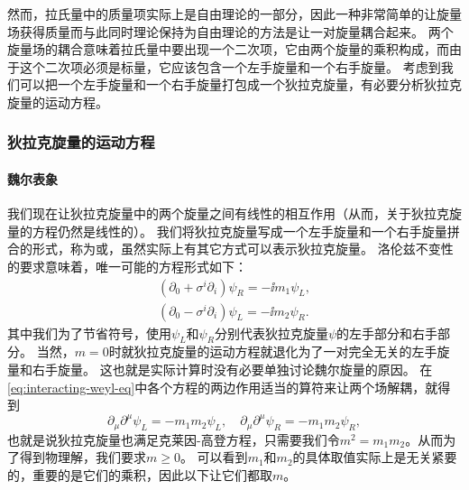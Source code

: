 然而，拉氏量中的质量项实际上是自由理论的一部分，因此一种非常简单的让旋量场获得质量而与此同时理论保持为自由理论的方法是让一对旋量耦合起来。
两个旋量场的耦合意味着拉氏量中要出现一个二次项，它由两个旋量的乘积构成，而由于这个二次项必须是标量，它应该包含一个左手旋量和一个右手旋量。
考虑到我们可以把一个左手旋量和一个右手旋量打包成一个狄拉克旋量，有必要分析狄拉克旋量的运动方程。

\subsubsection{狄拉克旋量的运动方程} 

\paragraph{魏尔表象} 我们现在让狄拉克旋量中的两个旋量之间有线性的相互作用（从而，关于狄拉克旋量的方程仍然是线性的）。
我们将狄拉克旋量写成一个左手旋量和一个右手旋量拼合的形式，称为或，虽然实际上有其它方式可以表示狄拉克旋量。
洛伦兹不变性的要求意味着，唯一可能的方程形式如下：
\begin{equation}
    \begin{aligned}
        (\partial_0 + \sigma^i \partial_i) \psi_R = - \ii m_1 \psi_L, \\
        (\partial_0 - \sigma^i \partial_i) \psi_L = - \ii m_2 \psi_R.
    \end{aligned}
    \label{eq:interacting-weyl-eq}
\end{equation}
其中我们为了节省符号，使用$\psi_L$和$\psi_R$分别代表狄拉克旋量$\psi$的左手部分和右手部分。
当然，$m=0$时就狄拉克旋量的运动方程就退化为了一对完全无关的左手旋量和右手旋量。
这也就是实际计算时没有必要单独讨论魏尔旋量的原因。
在\eqref{eq:interacting-weyl-eq}中各个方程的两边作用适当的算符来让两个场解耦，就得到
\[
    \partial_\mu \partial^\mu \psi_L = - m_1 m_2 \psi_L, \quad \partial_\mu \partial^\mu \psi_R = - m_1 m_2 \psi_R,
\]
也就是说狄拉克旋量也满足克莱因-高登方程，只需要我们令$m^2=m_1 m_2$。从而为了得到物理解，我们要求$m \geq 0$。
可以看到$m_1$和$m_2$的具体取值实际上是无关紧要的，重要的是它们的乘积，因此以下让它们都取$m$。


